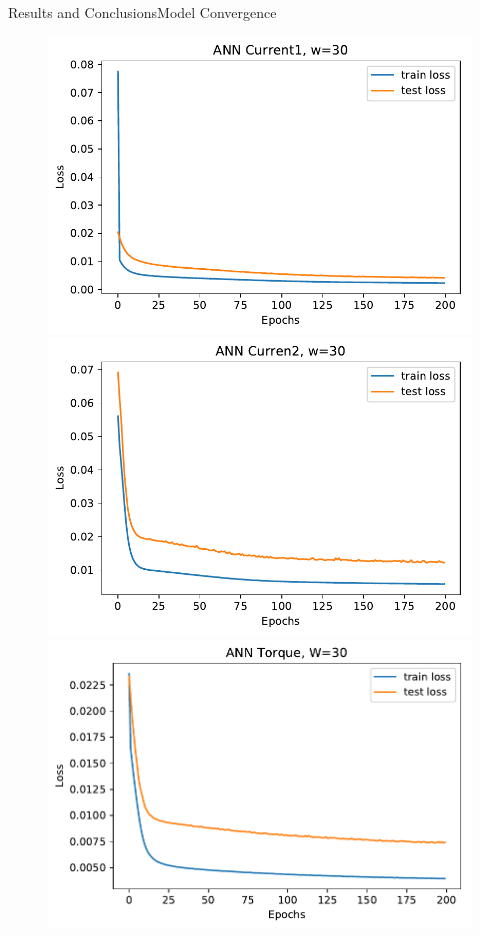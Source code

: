 \documentclass[handout]{beamer}
\begin{document}
\begin{frame}{Results and Conclusions}{Model Convergence}
\begin{center}
  \begin{figure}
  \includegraphics[scale=0.25]{images/ann30_curr1}
  \includegraphics[scale=0.25]{images/ann30_curr2}
  \includegraphics[scale=0.25]{images/ann30_torque}
  \end{figure}
\end{center}
\end{frame}
\end{document}
